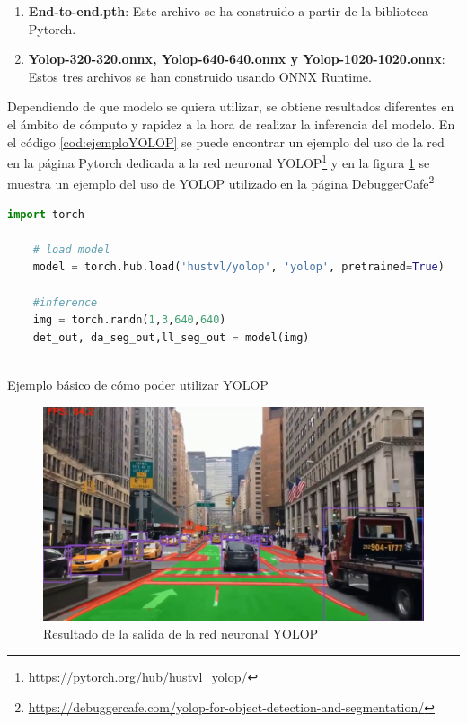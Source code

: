 \begin{enumerate}
  \item \textbf{End-to-end.pth}: Este archivo se ha construido a partir de la biblioteca Pytorch. 
  \item \textbf{Yolop-320-320.onnx, Yolop-640-640.onnx y Yolop-1020-1020.onnx}: Estos tres archivos se han construido usando ONNX Runtime.
\end{enumerate}

Dependiendo de que modelo se quiera utilizar, se obtiene resultados diferentes en el ámbito de cómputo y rapidez a la hora de 
realizar la inferencia del modelo. En el código \ref{cod:ejemploYOLOP} se puede encontrar un ejemplo del uso de la red en la página Pytorch dedicada a la red neuronal YOLOP\footnote{\url{https://pytorch.org/hub/hustvl_yolop/}}
y en la figura \ref{f:resultadosYOLOP} se muestra un ejemplo del uso de YOLOP utilizado en la página DebuggerCafe\footnote{\url{https://debuggercafe.com/yolop-for-object-detection-and-segmentation/}}

\begin{code}[h]
  \begin{lstlisting}[language=Python]
    import torch

    # load model
    model = torch.hub.load('hustvl/yolop', 'yolop', pretrained=True)
    
    #inference
    img = torch.randn(1,3,640,640)
    det_out, da_seg_out,ll_seg_out = model(img)
    
  \end{lstlisting}
  \caption[Cargar modelo YOLOP con pesos preentrenados End-to-end.pth]{Ejemplo básico de cómo poder utilizar YOLOP}
  \label{cod:ejemploYOLOP}
  \end{code}  

  \begin{figure}[H]
    \centering
    \begin{minipage}{0.54\textwidth}
      \includegraphics[width=\linewidth]{figs/Plataformas_Desarollo/YOLOP1.png}
    \end{minipage}
    \caption{Resultado de la salida de la red neuronal YOLOP}
    \label{f:resultadosYOLOP}
    \vspace{-1.5em}
  \end{figure}

